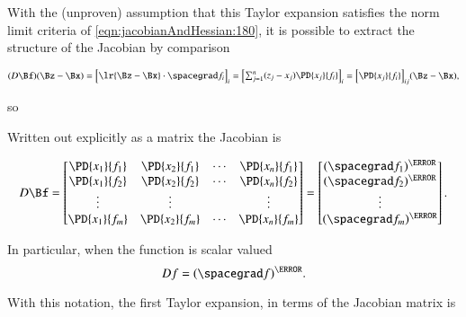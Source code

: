 With the (unproven) assumption that this Taylor expansion satisfies the norm limit criteria of \cref{eqn:jacobianAndHessian:180}, it is possible to extract the structure of the Jacobian by comparison

\begin{dmath}\label{eqn:jacobianAndHessian:220}
(D \Bf)
(\Bz - \Bx)
=
{\begin{bmatrix}
\lr{ \Bz - \Bx } \cdot \spacegrad f_i
\end{bmatrix}}_i
=
{\begin{bmatrix}
\sum_{j = 1}^n (z_j - x_j) \PD{x_j}{f_i}
\end{bmatrix}}_i
=
{\begin{bmatrix}
\PD{x_j}{f_i}
\end{bmatrix}}_{ij}
(\Bz - \Bx),
\end{dmath}

so

Written out explicitly as a matrix the Jacobian is

\begin{equation}\label{eqn:jacobianAndHessian:320}
D \Bf
=
\begin{bmatrix}
\PD{x_1}{f_1} & \PD{x_2}{f_1} & \cdots & \PD{x_n}{f_1} \\
\PD{x_1}{f_2} & \PD{x_2}{f_2} & \cdots & \PD{x_n}{f_2} \\
\vdots & \vdots & & \vdots \\
\PD{x_1}{f_m} & \PD{x_2}{f_m} & \cdots & \PD{x_n}{f_m} \\
\end{bmatrix}
=
\begin{bmatrix}
(\spacegrad f_1)^\T \\
(\spacegrad f_2)^\T \\
\vdots \\
(\spacegrad f_m)^\T
\end{bmatrix}.
\end{equation}

In particular, when the function is scalar valued
\begin{dmath}\label{eqn:jacobianAndHessian:360}
D f = (\spacegrad f)^\T.
\end{dmath}

With this notation, the first Taylor expansion, in terms of the Jacobian matrix is

